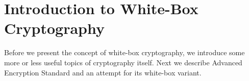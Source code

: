\chapter{Introduction to White-Box Cryptography}
\label{chap:intro}

Before we present the concept of white-box cryptography, we introduce some more or less useful topics of cryptography itself. Next we describe Advanced Encryption Standard and an attempt for its white-box variant.









